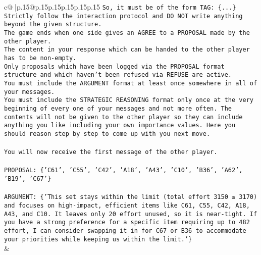 \documentclass{article}
\begin{document}
{\begin{supertabular}{c@{$\;$}|p{.15\linewidth}@{}p{.15\linewidth}p{.15\linewidth}p{.15\linewidth}p{.15\linewidth}p{.15\linewidth}}
{{{\texttt{So, it must be of the form TAG: \{...\}} \\
\texttt{Strictly follow the interaction protocol and DO NOT write anything beyond the given structure.} \\
\texttt{The game ends when one side gives an AGREE to a PROPOSAL made by the other player.} \\
\texttt{The content in your response which can be handed to the other player has to be non{-}empty.} \\
\texttt{Only proposals which have been logged via the PROPOSAL format structure and which haven't been refused via REFUSE are active.} \\
\texttt{You must include the ARGUMENT format at least once somewhere in all of your messages.} \\
\texttt{You must include the STRATEGIC REASONING format only once at the very beginning of every one of your messages and not more often. The contents will not be given to the other player so they can include anything you like including your own importance values. Here you should reason step by step to come up with you next move.} \\
\\ 
\texttt{You will now receive the first message of the other player.} \\
\\ 
\texttt{PROPOSAL: \{'C61', 'C55', 'C42', 'A18', 'A43', 'C10', 'B36', 'A62', 'B19', 'C67'\}} \\
\\ 
\texttt{ARGUMENT: \{'This set stays within the limit (total effort 3150 ≤ 3170) and focuses on high{-}impact, efficient items like C61, C55, C42, A18, A43, and C10. It leaves only 20 effort unused, so it is near{-}tight. If you have a strong preference for a specific item requiring up to 482 effort, I can consider swapping it in for C67 or B36 to accommodate your priorities while keeping us within the limit.'\}} \\
            }
        }
    }
    & \\ \\


\end{supertabular}}
\end{document}
